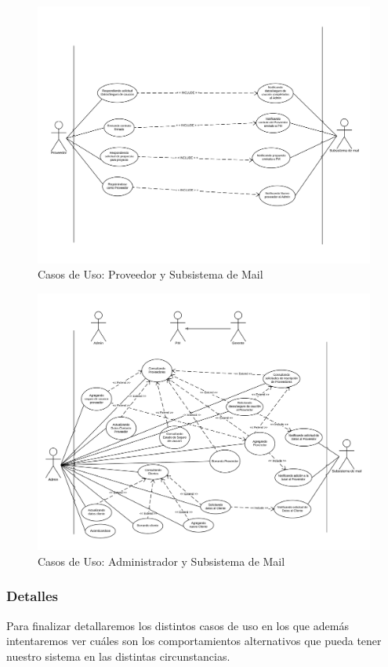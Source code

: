\begin{figure}[H]
    \centering
    \includegraphics[width=\linewidth]{diag/nuevos/cu-proveedor.png}
    \caption{Casos de Uso: Proveedor y Subsistema de Mail}
    \label{cu5}
\end{figure}

\begin{figure}[H]
    \centering
    \includegraphics[width=\linewidth]{diag/nuevos/cu-admin.png}
    \caption{Casos de Uso: Administrador y Subsistema de Mail}
    \label{cu6}
\end{figure}

\subsubsection{Detalles}
Para finalizar detallaremos los distintos casos de uso en los que además intentaremos ver cuáles son los comportamientos alternativos que pueda tener nuestro sistema en las distintas circunstancias.


